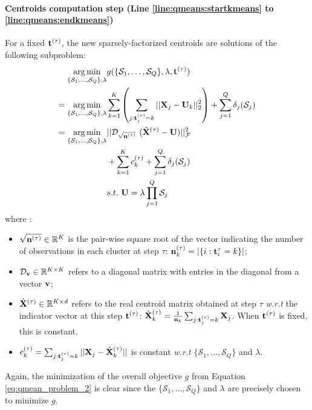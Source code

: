 \paragraph{Centroids computation step (Line \ref{line:qmeans:startkmeans} to \ref{line:qmeans:endkmeans})} For a fixed ${\mathbf{t}}^{(\tau)}$, the new sparsely-factorized centroids are solutions of the following subproblem:
%
\begin{equation}
\label{eq:qmeans_problem_t_fixed}
\begin{split}
 \operatorname*{arg\,min}_{\{ \mathcal{S}_1, \ldots,\mathcal{S}_Q\}, \lambda} & g(\{ \mathcal{S}_1, \ldots,\mathcal{S}_Q\}, \lambda, {\mathbf{t}}^{(\tau)}) \\
 = \operatorname*{arg\,min}_{\{ \mathcal{S}_1, \ldots,\mathcal{S}_Q\}, \lambda} &\sum_{k=1}^{K} \left( \sum_{j: {\mathbf{t}}^{(\tau)}_j = k} ||{\mathbf{X}}_j - {\mathbf{U}}_k||^2_2 \right) + \sum_{j=1}^{Q} \delta_j(\mathcal{S}_j)  \\
 = \operatorname*{arg\,min}_{\{ \mathcal{S}_1, \ldots,\mathcal{S}_Q\}, \lambda} & ||\mathcal{D}_{\sqrt{{\mathbf{n}}^{(\tau)}}}~(\hat{{\mathbf{X}}}^{(\tau)} - {\mathbf{U}})||_{\mathcal{F}} ^ 2  \\
 &+ \sum_{k=1}^{K} c_k^{(\tau)} + \sum_{j=1}^{Q} \delta_j(\mathcal{S}_j)\\
 & s.t. ~ {\mathbf{U}} = \lambda \prod_{j=1}^{Q}{\mathcal{S}_j}
\end{split} 
\end{equation}
%
where :
%
\begin{itemize}
 \item $\sqrt{{\mathbf{n}}^{(\tau)}} \in {\mathbb{R}^{K}}$ is the pair-wise square root of the vector indicating the number of observations in each cluster at step $\tau$: ${\mathbf{n}}_k^{(\tau)} = |\{i: {\mathbf{t}}^\tau_i = k\}|$;
 \item $\mathcal{D}_{\mathbf{v}} \in \mathbb{R}^{K \times K}$ refers to a diagonal matrix with entries in the diagonal from a vector ${\mathbf{v}}$;
 \item $\hat{{\mathbf{X}}}^{(\tau)} \in \mathbb{R}^{K \times d}$ refers to the real centroid matrix obtained at step $\tau$ \textit{w.r.t} the indicator vector at this step ${\mathbf{t}}^{(\tau)}$: $\hat{{\mathbf{X}}}^{(\tau)}_k = \frac{1}{{\mathbf{n}}_k}\sum_{j:{\mathbf{t}}^{(\tau)}_j = k} {{\mathbf{X}}_j}$. When ${\mathbf{t}}^{(\tau)}$ is fixed, this is constant.
 \item $c_k^{(\tau)} = \sum_{j: {\mathbf{t}}^{(\tau)}_j = k}^{}||{\mathbf{X}}_j - \hat{{\mathbf{X}}}_k^{(\tau)}||$ is constant \textit{w.r.t} $\{ \mathcal{S}_1, \ldots,\mathcal{S}_Q\}$ and $\lambda$.
\end{itemize}

Again,  the minimization of the overall objective $g$ from Equation \ref{eq:qmean_problem_2} is clear since the $\{ \mathcal{S}_1, \ldots,\mathcal{S}_Q\}$ and $\lambda$ are precisely chosen to minimize $g$.

